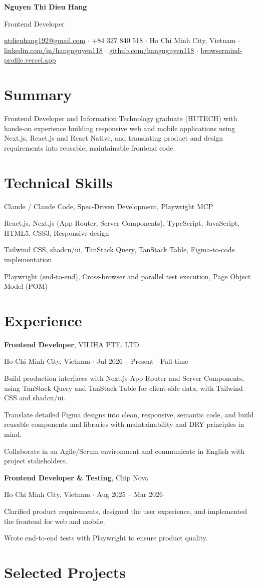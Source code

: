 \documentclass[11pt,a4paper]{article}
\newcommand{\cvname}[1]{\begin{center}{\fontsize{18}{20}\selectfont\bfseries #1}\end{center}\vspace{0.1em}}
\newcommand{\cvheadline}[1]{\begin{center}{\large #1}\end{center}\vspace{0.25em}}
\newcommand{\cvcontact}[1]{\begin{center}{\small\color{muted}#1}\end{center}\vspace{0.1em}}
\newcommand{\cvsection}[1]{\section*{#1}}
\newcommand{\cvsummary}[1]{#1\par\vspace{0.1em}}
\newcommand{\cvitem}[2]{%
  \vspace{0.3em}%
  #1\par
  {\small\color{muted}#2}\par
}
\newcommand{\cvskill}[2]{\vspace{0.08em}{\bfseries #1:} #2\par}
\begin{document}
\cvname{Nguyen Thi Dieu Hang}
\cvheadline{Frontend Developer}
\cvcontact{\href{mailto:ntdieuhang192@gmail.com}{ntdieuhang192@gmail.com} $\cdot$ +84 327 840 518 $\cdot$ Ho Chi Minh City, Vietnam $\cdot$ \href{https://www.linkedin.com/in/hangnguyen118}{linkedin.com/in/hangnguyen118} $\cdot$ \href{https://github.com/hangnguyen118}{github.com/hangnguyen118} $\cdot$ \href{https://browsermind-profile.vercel.app}{browsermind-profile.vercel.app}}
\cvsection{Summary}
\cvsummary{Frontend Developer and Information Technology graduate (HUTECH) with hands-on experience building responsive web and mobile applications using Next.js, React.js and React Native, and translating product and design requirements into reusable, maintainable frontend code.}
\cvsection{Technical Skills}
\cvskill{AI-assisted development}{Claude / Claude Code, Spec-Driven Development, Playwright MCP}
\cvskill{Frontend}{React.js, Next.js (App Router, Server Components), TypeScript, JavaScript, HTML5, CSS3, Responsive design}
\cvskill{UI and data}{Tailwind CSS, shadcn/ui, TanStack Query, TanStack Table, Figma-to-code implementation}
\cvskill{Testing and verification}{Playwright (end-to-end), Cross-browser and parallel test execution, Page Object Model (POM)}
\cvsection{Experience}
\cvitem{\textbf{Frontend Developer}, VILIHA PTE. LTD.}{Ho Chi Minh City, Vietnam $\cdot$ Jul 2026 – Present $\cdot$ Full-time}
\begin{cvbullets}
  \item Build production interfaces with Next.js App Router and Server Components, using TanStack Query and TanStack Table for client-side data, with Tailwind CSS and shadcn/ui.
  \item Translate detailed Figma designs into clean, responsive, semantic code, and build reusable components and libraries with maintainability and DRY principles in mind.
  \item Collaborate in an Agile/Scrum environment and communicate in English with project stakeholders.
\end{cvbullets}
\cvitem{\textbf{Frontend Developer \& Testing}, Chip Nova}{Ho Chi Minh City, Vietnam $\cdot$ Aug 2025 – Mar 2026}
\begin{cvbullets}
  \item Clarified product requirements, designed the user experience, and implemented the frontend for web and mobile.
  \item Wrote end-to-end tests with Playwright to ensure product quality.
\end{cvbullets}
\cvsection{Selected Projects}
\end{document}
